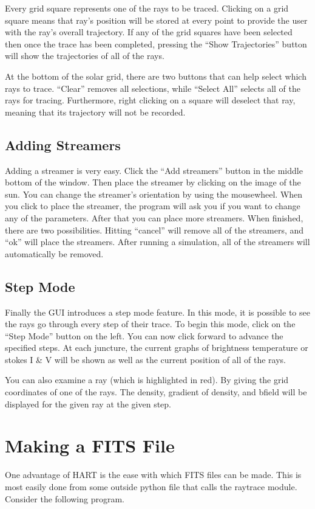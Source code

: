 \documentclass[12pt]{article}
\begin{document}
Every grid square represents one of the rays to be traced. Clicking on
a grid square means that ray's position will be stored at every point
to provide the user with the ray's overall trajectory. If any of the
grid squares have been selected then once the trace has been
completed, pressing the ``Show Trajectories'' button will show the
trajectories of all of the rays.

At the bottom of the solar grid, there are two buttons that can help
select which rays to trace. ``Clear'' removes all selections, while
``Select All'' selects all of the rays for tracing. Furthermore, right
clicking on a square will deselect that ray, meaning that its
trajectory will not be recorded.

\subsection{Adding Streamers}
Adding a streamer is very easy. Click the ``Add streamers'' button in
the middle bottom of the window. Then place the streamer by clicking
on the image of the sun. You can change the streamer's orientation by
using the mousewheel. When you click to place the streamer, the
program will ask you if you want to change any of the
parameters. After that you can place more streamers. When finished,
there are two possibilities. Hitting ``cancel'' will remove all of 
the streamers, and ``ok'' will place the streamers. After running 
a simulation, all of the streamers will automatically be removed.

\subsection{Step Mode}
Finally the GUI introduces a step mode feature. In this mode, it is
possible to see the rays go through every step of their trace. To
begin this mode, click on the ``Step Mode'' button on the left. You 
can now click forward to advance the specified steps. At each
juncture, the current graphs of brightness temperature or stokes 
I \& V will be shown as well as the current position of all of the rays.

You can also examine a ray (which is highlighted in red). By giving
the grid coordinates of one of the rays. The density, gradient of
density, and bfield will be displayed for the given ray at the given step. 

\section{Making a FITS File}
One advantage of HART is the ease with which FITS files can be
made. This is most easily done from some outside python file that
calls the raytrace module. Consider the following program.
\end{document}
